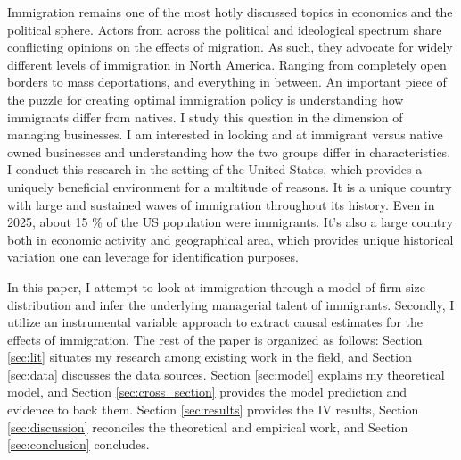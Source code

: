 
Immigration remains one of the most hotly discussed topics in economics and the political sphere. Actors from across the political and ideological spectrum share conflicting opinions on the effects of migration. As such, they advocate for widely different levels of immigration in North America. Ranging from completely open borders to mass deportations, and everything in between. An important piece of the puzzle for creating optimal immigration policy is understanding how immigrants differ from natives. I study this question in the dimension of managing businesses. I am interested in looking and at immigrant versus native owned businesses and understanding how the two groups differ in characteristics. I conduct this research in the setting of the United States, which provides a uniquely beneficial environment for a multitude of reasons. It is a unique country with large and sustained waves of immigration throughout its history. Even in 2025, about 15 \% of the US population were immigrants. It's also a large country both in economic activity and geographical area, which provides unique historical variation one can leverage for identification purposes. 

In this paper, I attempt to look at immigration through a model of firm size distribution and infer the underlying managerial talent of immigrants. Secondly, I utilize an instrumental variable approach to extract causal estimates for the effects of immigration. The rest of the paper is organized as follows: Section \ref{sec:lit} situates my research among existing work in the field, and Section \ref{sec:data} discusses the data sources. Section \ref{sec:model} explains my theoretical model, and Section \ref{sec:cross_section} provides the model prediction and evidence to back them. Section \ref{sec:results} provides the IV results, Section \ref{sec:discussion} reconciles the theoretical and empirical work, and Section \ref{sec:conclusion} concludes.